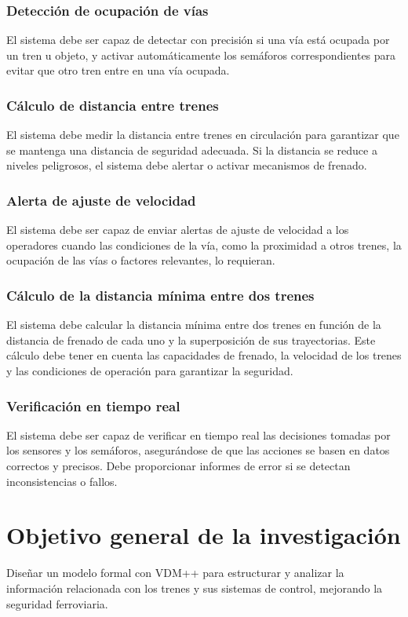 \documentclass[journal]{IEEEtran}
\begin{document}
\subsubsection{Detección de ocupación de vías}  
El sistema debe ser capaz de detectar con precisión si una vía está ocupada por un tren u objeto, y activar automáticamente los semáforos correspondientes para evitar que otro tren entre en una vía ocupada.

\subsubsection{Cálculo de distancia entre trenes}  
El sistema debe medir la distancia entre trenes en circulación para garantizar que se mantenga una distancia de seguridad adecuada. Si la distancia se reduce a niveles peligrosos, el sistema debe alertar o activar mecanismos de frenado.

\subsubsection{Alerta de ajuste de velocidad}  
El sistema debe ser capaz de enviar alertas de ajuste de velocidad a los operadores cuando las condiciones de la vía, como la proximidad a otros trenes, la ocupación de las vías o factores relevantes, lo requieran.

\subsubsection{Cálculo de la distancia mínima entre dos trenes}  
El sistema debe calcular la distancia mínima entre dos trenes en función de la distancia de frenado de cada uno y la superposición de sus trayectorias. Este cálculo debe tener en cuenta las capacidades de frenado, la velocidad de los trenes y las condiciones de operación para garantizar la seguridad.

\subsubsection{Verificación en tiempo real}  
El sistema debe ser capaz de verificar en tiempo real las decisiones tomadas por los sensores y los semáforos, asegurándose de que las acciones se basen en datos correctos y precisos. Debe proporcionar informes de error si se detectan inconsistencias o fallos.

\section{Objetivo general de la investigación}  
Diseñar un modelo formal con VDM++ para estructurar y analizar la información relacionada con los trenes y sus sistemas de control, mejorando la seguridad ferroviaria.
\end{document}
